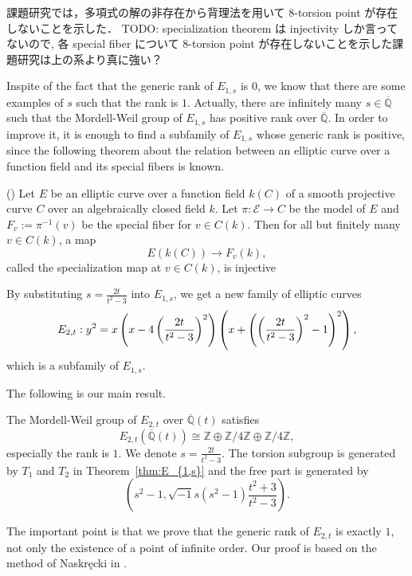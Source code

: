 \documentclass[main]{subfiles}
\begin{document}
\begin{rem}
    課題研究では，多項式の解の非存在から背理法を用いて 8-torsion point が存在しないことを示した．
    TODO: specialization theorem は injectivity しか言ってないので, 各 special fiber について 8-torsion point が存在しないことを示した課題研究は上の系より真に強い？
\end{rem}

Inspite of the fact that the generic rank of $E_{1,s}$ is $0$, we know that there are some examples of $s$ such that the rank is $1$.
Actually, there are infinitely many $s \in \overline{\mathbb{Q}}$ such that the Mordell-Weil group of $E_{1,s}$ has positive rank over $\overline{\mathbb{Q}}$.
In order to improve it, it is enough to find a subfamily of $E_{1,s}$ whose generic rank is positive, since the following theorem about the relation between an elliptic curve over a function field and its special fibers is known.
\begin{thm}{(\cite[Theorem 11.4.]{ref:advancedaec})}
    Let $E$ be an elliptic curve over a function field $k(C)$ of a smooth projective curve $C$ over an algebraically closed field $k$.
    Let $\pi: \mathcal{E} \to C$ be the \Neron{} model of $E$ and $F_v:=\pi^{-1}(v)$ be the special fiber for $v \in C(k)$.
    Then for all but finitely many $v \in C(k)$, a map
    \begin{equation}
        E(k(C)) \to F_{v}(k),
    \end{equation}
    called the specialization map at $v \in C(k)$, is injective
\end{thm}

By substituting $s = \frac{2t}{t^{2} - 3}$ into $E_{1,s}$, we get a new family of elliptic curves
\begin{equation}
    \label{eq:E_{2,t}}
        E_{2,t}: y^{2} = x\left(x - 4\left(\frac{2t}{t^{2} - 3}\right)^{2}\right)\left(x + \left(\left(\frac{2t}{t^{2} - 3}\right)^{2} - 1\right)^{2}\right),
    \end{equation}
which is a subfamily of $E_{1,s}$.

The following is our main result.
\begin{thm}
    \label{thm:E_{2,t}}
    The Mordell-Weil group of $E_{2,t}$ over $\overline{\mathbb{Q}}(t)$ satisfies
    \begin{equation}
        E_{2,t}(\overline{\mathbb{Q}}(t)) \cong \mathbb{Z} \oplus \mathbb{Z} / 4 \mathbb{Z} \oplus \mathbb{Z} / 4 \mathbb{Z},
    \end{equation}
    especially the rank is $1$.
    We denote $s = \frac{2t}{t^{2} - 3}$. The torsion subgroup is generated by $T_1$ and $T_2$ in Theorem~\ref{thm:E_{1,s}} and the free part is generated by
    \begin{equation}
        \left(s^{2} - 1, \sqrt{-1} s(s^{2} - 1) \frac{t^{2} + 3}{t^{2} - 3} \right).
    \end{equation}
\end{thm}
The important point is that we prove that the generic rank of $E_{2,t}$ is exactly $1$, not only the existence of a point of infinite order.
Our proof is based on the method of Naskręcki in \cite{ref:naskrecki2013}.
\end{document}
